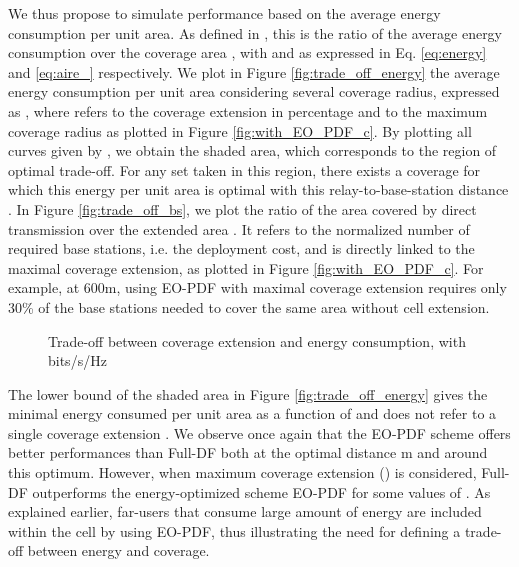 \documentclass[journal]{IEEEtran}
\theoremstyle{definition}
\begin{document}
We thus propose to simulate performance based on the average energy consumption per unit area. As defined in \cite{correia2010}, this is the ratio of the average energy consumption over the coverage area , with  and  as expressed in Eq. \eqref{eq:energy} and \eqref{eq:aire_} respectively.
We plot in Figure \ref{fig:trade_off_energy} the average energy consumption per unit area considering several coverage radius, expressed as
,
where  refers to the coverage extension in percentage and  to the maximum coverage radius as plotted in Figure \ref{fig:with_EO_PDF_c}.
By plotting all curves given by , we obtain the shaded area, which corresponds to the region of optimal trade-off. For any set  taken in this region, there exists a coverage  for which this energy per unit area is optimal with this relay-to-base-station distance .
In Figure \ref{fig:trade_off_bs}, we plot the ratio of the area covered by direct transmission over the extended area . It refers to the normalized number of required base stations, i.e. the deployment cost, and is directly linked to the maximal coverage extension, as plotted in Figure \ref{fig:with_EO_PDF_c}. For example, at 600m, using EO-PDF with maximal coverage extension requires only 30\% of the base stations needed to cover the same area without cell extension.



\begin{figure}
	{\centering 
	\caption{Trade-off between coverage extension and energy consumption, with bits/s/Hz}  
	\label{fig:trade_off}
	}
\end{figure}

The lower bound of the shaded area in Figure \ref{fig:trade_off_energy} gives the minimal energy consumed per unit area as a function of  and does not refer to a single coverage extension .
We observe once again that the EO-PDF scheme offers better performances than Full-DF both at the optimal distance m and around this optimum. However, when maximum coverage extension () is considered, Full-DF outperforms the energy-optimized scheme EO-PDF for some values of . As explained earlier, far-users that consume large amount of energy are included within the cell by using EO-PDF, thus illustrating the need for defining a trade-off between energy and coverage.
\end{document}
